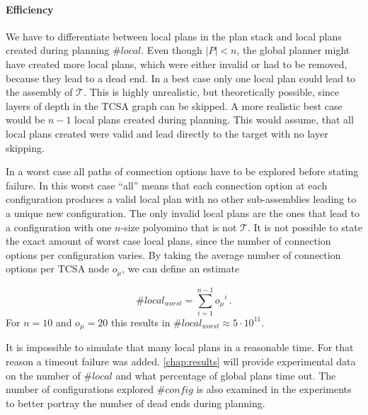 \paragraph{Efficiency}

We have to differentiate between local plans in the plan stack and local plans created during planning $\#\textit{local}$.
Even though $|P| < n$, the global planner might have created more local plans, which were either invalid or had to be removed, because they lead to a dead end.
In a best case only one local plan could lead to the assembly of $\mathcal{T}$.
This is highly unrealistic, but theoretically possible, since layers of depth in the TCSA graph can be skipped.
A more realistic best case would be $n-1$ local plans created during planning. 
This would assume, that all local plans created were valid and lead directly to the target with no layer skipping.

In a worst case all paths of connection options have to be explored before stating failure.
In this worst case ``all'' means that each connection option at each configuration produces a valid local plan with no other sub-assemblies leading to a unique new configuration.
The only invalid local plans are the ones that lead to a configuration with one $n$-size polyomino that is not $\mathcal{T}$.
It is not possible to state the exact amount of worst case local plans, since the number of connection options per configuration varies.
By taking the average number of connection options per TCSA node $o_\mu$, we can define an estimate

\begin{equation}
\#\textit{local}_\textit{worst} = \sum_{i=1}^{n-1} {o_\mu}^i \, .
\end{equation} 
For $n = 10$ and $o_\mu = 20$ this results in $\#\textit{local}_\textit{worst} \approx 5 \cdot 10^{11}$.

It is impossible to simulate that many local plans in a reasonable time.
For that reason a timeout failure was added.
\autoref{chap:results} will provide experimental data on the number of $\#\textit{local}$ and what percentage of global plans time out.
The number of configurations explored $\#\textit{config}$ is also examined in the experiments to better portray the number of dead ends during planning.




